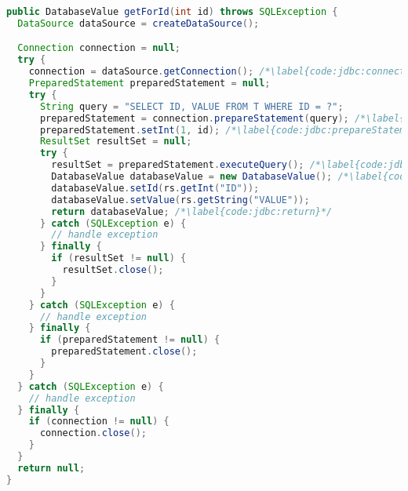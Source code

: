 
\begin{lstlisting}[language=Java, caption={Example of loading data from Oracle database using JDBC API}, label={code:jdbc}]
public DatabaseValue getForId(int id) throws SQLException {
  DataSource dataSource = createDataSource();

  Connection connection = null;
  try {
    connection = dataSource.getConnection(); /*\label{code:jdbc:connection}*/
    PreparedStatement preparedStatement = null;
    try {
      String query = "SELECT ID, VALUE FROM T WHERE ID = ?";
      preparedStatement = connection.prepareStatement(query); /*\label{code:jdbc:prepareStatement:begin}*/
      preparedStatement.setInt(1, id); /*\label{code:jdbc:prepareStatement:end}*/
      ResultSet resultSet = null;
      try {
        resultSet = preparedStatement.executeQuery(); /*\label{code:jdbc:executeQuery}*/
        DatabaseValue databaseValue = new DatabaseValue(); /*\label{code:jdbc:mapping}*/
        databaseValue.setId(rs.getInt("ID"));
        databaseValue.setValue(rs.getString("VALUE"));
        return databaseValue; /*\label{code:jdbc:return}*/
      } catch (SQLException e) {
        // handle exception
      } finally {
        if (resultSet != null) {
          resultSet.close();
        }
      }
    } catch (SQLException e) {
      // handle exception
    } finally {
      if (preparedStatement != null) {
        preparedStatement.close();
      }
    }
  } catch (SQLException e) {
    // handle exception
  } finally {
    if (connection != null) {
      connection.close();
    }
  }
  return null;
}
\end{lstlisting}
